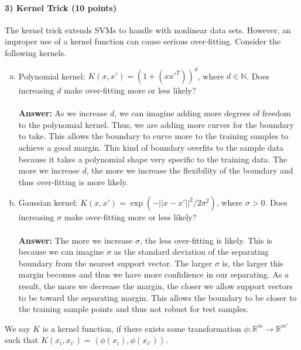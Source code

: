 \documentclass[11pt]{article}
\begin{document}
\paragraph{3) Kernel Trick (10 points)}
The kernel trick extends SVMs to handle with nonlinear data sets. However, an improper use of a kernel function can cause serious over-fitting. Consider the following kernels.
\begin{enumerate}[(a)]
\item Polynomial kernel: $K(x, x') = (1 + (x x'^T))^d$, where  $d\in\mathbb{N}$. Does increasing $d$ make over-fitting more or less likely?
\\ \\
{\bf Answer: }
As we increase $d$, we can imagine adding more degrees of freedom to the polynomial kernel. Thus, we are adding more curves for the boundary to take. This allows the boundary to curve more to the training samples to achieve a good margin. This kind of boundary overfits to the sample data because it takes a polynomial shape very specific to the training data. The more we increase $d$, the more we increase the flexibility of the boundary and thus over-fitting is more likely. 

\item Gaussian kernel: $K(x, x') = \exp(-|| x-x'||^2 / 2 \sigma^2)$, where $\sigma>0$. Does increasing $\sigma$ make over-fitting more or less likely?
\\ \\
{\bf Answer: }
The more we increase $\sigma$, the less over-fitting is likely. This is because we can imagine $\sigma$ as the standard deviation of the separating boundary from the nearest support vector. The larger $\sigma$ is, the larger this margin becomes and thus we have more confidience in our separating. As a result, the more we decrease the margin, the closer we allow support vectors to be toward the separating margin. This allows the boundary to be closer to the training sample points and thus not robust for test samples.


\end{enumerate}
We say $K$ is a kernel function, if there exists some transformation $\phi:\mathbb{R}^m\rightarrow \mathbb{R}^{m'}$ such that $K(x_i,x_{i'}) = \left<\phi(x_i),\phi(x_{i'})\right>$.
\end{document}
